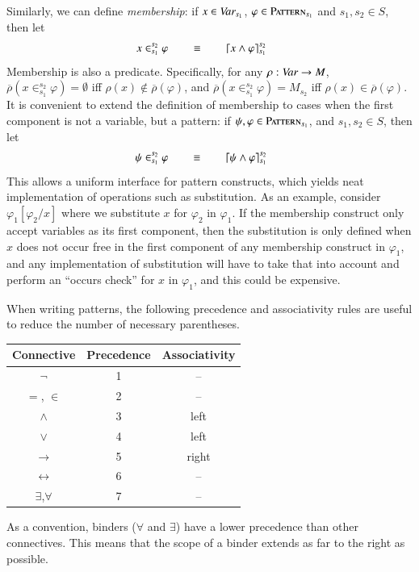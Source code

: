 \documentclass[UTF8,11pt]{article}
\theoremstyle{plain}
\theoremstyle{definition}
\theoremstyle{remark}
\newcommand{\Pattern}{\textsc{Pattern}\xspace}
\newcommand{\ra}{\rightarrow}
\begin{document}
Similarly, we can define \emph{membership}:
if $x\in\textit{Var}_{s_1}$, $\varphi\in\Pattern_{s_1}$ and $s_1,s_2\in S$, then
let
$$
\begin{array}{@{}rcll}
x \in_{s_1}^{s_2} \varphi & \ \ \ \ \ \equiv \ \ \ \ \ &
\lceil x \wedge \varphi\rceil_{s_1}^{s_2}
& %
\end{array}
$$
Membership is also a predicate.
Specifically, for any $\rho:\Var\ra M$,
$\overline{\rho}(x \in_{s_1}^{s_2} \varphi) = \emptyset$
iff $\rho(x) \not\in \overline{\rho}(\varphi)$, and
$\overline{\rho}(x \in_{s_1}^{s_2} \varphi) = M_{s_2}$
iff $\rho(x) \in \overline{\rho}(\varphi)$.
It is convenient to extend the definition of membership to cases when the first
component is not a variable, but a pattern:
if $\psi, \varphi \in \Pattern_{s_1}$, and $s_1,s_2\in S$,
then let
$$
\begin{array}{@{}rcll}
\psi \in_{s_1}^{s_2} \varphi & \ \ \ \ \ \equiv \ \ \ \ \ &
\lceil \psi \wedge \varphi\rceil_{s_1}^{s_2}
& %
\end{array}
$$
This allows a uniform interface for pattern constructs, which yields neat
implementation of operations such as substitution.
As an example, consider $\varphi_1[\varphi_2 / x]$ where we
substitute $x$ for $\varphi_2$ in $\varphi_1$.
If the membership construct only accept variables as its first component, then
the substitution is only defined when $x$ does not occur free in the first
component of any membership construct in $\varphi_1$, and any implementation of
substitution will have to take that into account and perform an
``occurs check'' for $x$ in $\varphi_1$, and this could be expensive.

When writing patterns, the following precedence and associativity rules are
useful to reduce the
number of necessary parentheses.
\begin{center}
 \begin{tabular}{c|c|c}
  Connective      &     Precedence & Associativity \\\hline
  $\neg$          &     1          &  --           \\\hline
  $=$, $\in$      &     2          &  --           \\\hline
  $\wedge$        &     3          &  left         \\\hline
  $\vee$          &     4          &  left         \\\hline
  $\to$           &     5          &  right        \\\hline
  $\leftrightarrow$ &   6          &  --           \\\hline
  $\exists$,$\forall$ & 7          &  --           \\\hline
 \end{tabular}
\end{center}
As a convention, binders ($\forall$ and $\exists$) have a lower precedence than
other connectives.
This means that the scope of a binder extends as far to the right as possible.
\end{document}
